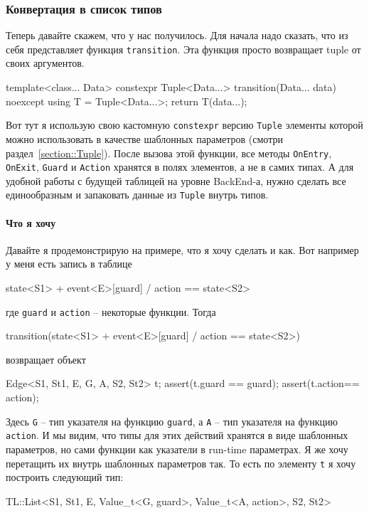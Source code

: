 \documentclass{article}
\begin{document}
{\subsubsection{Конвертация в список типов}
\label{section::SMFrontToBackConvert}

Теперь давайте скажем, что у нас получилось.
Для начала надо сказать, что из себя представляет функция \verb"transition".
Эта функция просто возвращает tuple от своих аргументов.
\begin{cppcode}[\nonumbers]
template<class... Data>
constexpr Tuple<Data...> transition(Data... data) noexcept {
  using T = Tuple<Data...>;
  return T(data...);
}
\end{cppcode}
Вот тут я использую свою кастомную \verb"constexpr" версию \verb"Tuple" элементы которой можно использовать в качестве шаблонных параметров (смотри раздел~\ref{section::Tuple}).
После вызова этой функции, все методы \verb"OnEntry", \verb"OnExit", \verb"Guard" и \verb"Action" хранятся в полях элементов, а не в самих типах.
А для удобной работы с будущей таблицей на уровне BackEnd-а, нужно сделать все единообразным и запаковать данные из \verb"Tuple" внутрь типов.

\paragraph{Что я хочу}

Давайте я продемонстрирую на примере, что я хочу сделать и как.
Вот например у меня есть запись в таблице
\begin{cppcode}[\nonumbers]
state<S1> + event<E>[guard] / action == state<S2>
\end{cppcode}
где \verb"guard" и \verb"action" -- некоторые функции.
Тогда
\begin{cppcode}[\nonumbers]
transition(state<S1> + event<E>[guard] / action == state<S2>)
\end{cppcode}
возвращает объект
\begin{cppcode}[\nonumbers]
Edge<S1, St1, E, G, A, S2, St2> t;
assert(t.guard == guard);
assert(t.action== action);
\end{cppcode}
Здесь \verb"G" -- тип указателя на функцию \verb"guard", а \verb"A" -- тип указателя на функцию \verb"action".
И мы видим, что типы для этих действий хранятся в виде шаблонных параметров, но сами функции как указатели в run-time параметрах.
Я же хочу перетащить их внутрь шаблонных параметров так.
То есть по элементу \verb"t" я хочу построить следующий тип:
\begin{cppcode}[\nonumbers]
TL::List<S1, St1, E, Value_t<G, guard>, Value_t<A, action>, S2, St2>
\end{cppcode}

}
\end{document}
